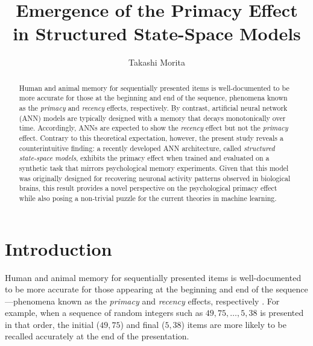 \documentclass[10pt,letterpaper]{article}
\date{}
\title{Emergence of the Primacy Effect in Structured State-Space Models}
\author{Takashi Morita}
\affil{Academy of Emerging Sciences, Chubu University}
\affil{\nolinkurl{tmorita@alum.mit.edu}}
\begin{document}

\maketitle

\begin{abstract}
	Human and animal memory for sequentially presented items is well-documented to be more accurate for those at the beginning and end of the sequence, phenomena known as the \emph{primacy} and \emph{recency} effects, respectively.
	By contrast, artificial neural network (ANN) models are typically designed with a memory that decays monotonically over time.
	Accordingly, ANNs are expected to show the \emph{recency} effect but not the \emph{primacy} effect.
	Contrary to this theoretical expectation, however, the present study reveals a counterintuitive finding: a recently developed ANN architecture, called \emph{structured state-space models}, exhibits the primacy effect when trained and evaluated on a synthetic task that mirrors psychological memory experiments.
	Given that this model was originally designed for recovering neuronal activity patterns observed in biological brains, this result provides a novel perspective on the psychological primacy effect while also posing a non-trivial puzzle for the current theories in machine learning.
\end{abstract}

\section{Introduction}

Human and animal memory for sequentially presented items is well-documented to be more accurate for those appearing at the beginning and end of the sequence---phenomena known as the \emph{primacy} and \emph{recency} effects, respectively \citep[][]{Ebbinghaus13,Murdock62,GlanzerCunitz66}.
For example, when a sequence of random integers such as $49,75,\dots,5,38$ is presented in that order, the initial ($49,75$) and final ($5,38$) items are more likely to be recalled accurately at the end of the presentation.
\end{document}
